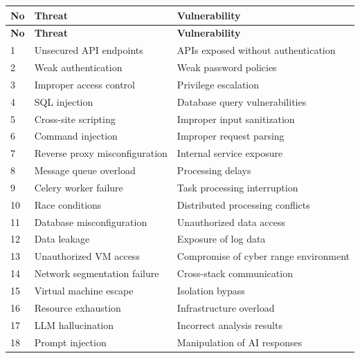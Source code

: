 \setlength{\LTpre}{0pt}
\setlength{\LTpost}{0pt}
\renewcommand{\arraystretch}{1.2}
\begin{longtable}{|p{}|p{}|p{}|}
    \hline
    \textbf{No} & \textbf{Threat} & \textbf{Vulnerability} \\
    \hline
    \endfirsthead
    \hline
    \textbf{No} & \textbf{Threat} & \textbf{Vulnerability} \\
    \hline
    \endhead
    1 & Unsecured API endpoints & APIs exposed without authentication \\
        \hline
        2 & Weak authentication & Weak password policies \\
        \hline
        3 & Improper access control & Privilege escalation \\
        \hline
        4 & SQL injection & Database query vulnerabilities \\
        \hline
        5 & Cross-site scripting & Improper input sanitization \\
        \hline
        6 & Command injection & Improper request parsing \\
        \hline
        7 & Reverse proxy misconfiguration & Internal service exposure \\
        \hline
        8 & Message queue overload & Processing delays \\
        \hline
        9 & Celery worker failure & Task processing interruption \\
        \hline
        10 & Race conditions & Distributed processing conflicts \\
        \hline
        11 & Database misconfiguration & Unauthorized data access \\
        \hline
        12 & Data leakage & Exposure of log data \\
        \hline
        13 & Unauthorized VM access & Compromise of cyber range environment \\
        \hline
        14 & Network segmentation failure & Cross-stack communication \\
        \hline
        15 & Virtual machine escape & Isolation bypass \\
        \hline
        16 & Resource exhaustion & Infrastructure overload \\
        \hline
        17 & LLM hallucination & Incorrect analysis results \\
        \hline
        18 & Prompt injection & Manipulation of AI responses \\

\end{longtable}
